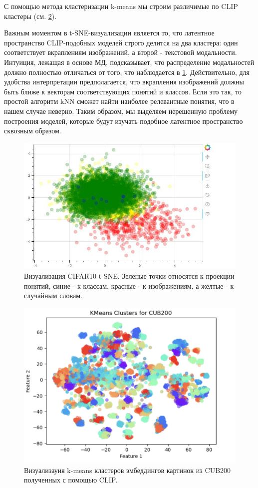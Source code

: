 С помощью метода кластеризации k-means мы строим различимые по CLIP кластеры (см. \cref{fig:kmeans}).

Важным моментом в t-SNE-визуализации является то, что латентное пространство CLIP-подобных моделей строго делится на два кластера: один соответствует вкраплениям изображений, а второй - текстовой модальности. Интуиция, лежащая в основе МД, подсказывает, что распределение модальностей должно полностью отличаться от того, что наблюдается в \cref{fig:tsne}. Действительно, для удобства интерпретации предполагается, что вкрапления изображений должны быть ближе к векторам соответствующих понятий и классов. Если это так, то простой алгоритм kNN сможет найти наиболее релевантные понятия, что в нашем случае неверно. Таким образом, мы выделяем нерешенную проблему построения моделей, которые будут изучать подобное латентное пространство сквозным образом.

\begin{figure}[h]
\begin{center}
\centerline{\includegraphics[width=0.5\columnwidth]{./figures/cifar10tsne.jpg}} 
\caption{Визуализация CIFAR10 t-SNE. Зеленые точки относятся к проекции понятий, синие - к классам, красные - к изображениям, а желтые - к случайным словам.}
\label{fig:tsne}
\end{center}
\end{figure}

\begin{figure}[t]%
\begin{center}
\centerline{\includegraphics[width=\columnwidth]{./figures/cub_kmeans-compressed.png}} 
\caption{Визуализауия k-means кластеров эмбеддингов картинок из CUB200 полученных с помощью CLIP.}
\label{fig:kmeans}
\end{center}
\end{figure}


